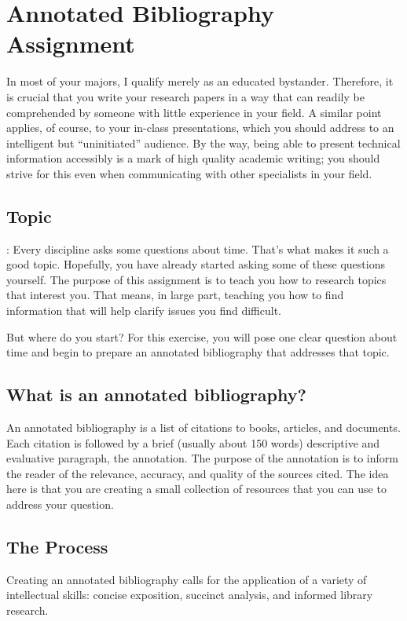 \documentclass[10pt, oneside]{article}
\begin{document}
\thispagestyle{fancy}

\section*{Annotated Bibliography Assignment}

In most of your majors, I qualify merely as an educated bystander. Therefore, it is crucial that you write your research papers in a way that can readily be comprehended by someone with little experience in your field. A similar point applies, of course, to your in-class presentations, which you should address to an intelligent but ``uninitiated'' audience. By the way, being able to present technical information accessibly is a mark of high quality academic writing; you should strive for this even when communicating with other specialists in your field.

\subsection*{Topic}: Every discipline asks some questions about time. That's what makes it such a good topic. Hopefully, you have already started asking some of these questions yourself. The purpose of this assignment is to teach you how to research topics that interest you. That means, in large part, teaching you how to find information that will help clarify issues you find difficult. 

But where do you start?  For this exercise, you will pose one clear question about time and begin to prepare an annotated bibliography that addresses that topic. 

\subsection*{What is an annotated bibliography?}
An annotated bibliography is a list of citations to books, articles, and documents. Each citation is followed by a brief (usually about 150 words) descriptive and evaluative paragraph, the annotation. The purpose of the annotation is to inform the reader of the relevance, accuracy, and quality of the sources cited. The idea here is that you are creating a small collection of resources that you can use to address your question. 

\subsection*{The Process}
\noindent Creating an annotated bibliography calls for the application of a variety of intellectual skills: concise exposition, succinct analysis, and informed library research.
\end{document}
